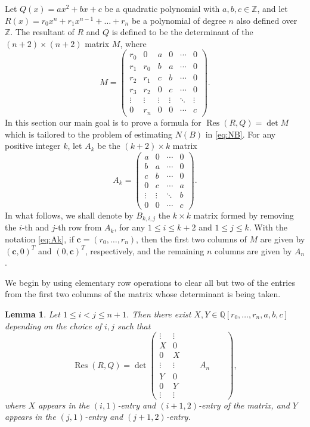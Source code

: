 \documentclass[reqno, 12pt, twoside]{amsart}
\numberwithin{equation}{section}
\DeclareMathOperator{\Res}{Res}
\newcommand{\Q}{\mathbb{Q}}
\newcommand{\Z}{\mathbb{Z}}
\newcommand{\0}{\mathbf{0}}
\newtheorem{lemma}[theorem]{Lemma}
\theoremstyle{definition}
\renewcommand{\leq}{\leqslant}
\begin{document}
Let $Q(x)=ax^2+bx+c$ be a quadratic polynomial with $a,b,c\in \Z$, and let 
$R(x)=r_0x^n+r_1x^{n-1}+\dots+r_n$ be a polynomial of degree $n$ also defined over $\Z$.
The resultant of $R$ and $Q$ is defined to be 
the determinant of the $(n+2)\times (n+2)$ matrix $M$, where
$$
M=
\begin{pmatrix}
r_0 & 0& a& 0& \cdots  & 0 \\
r_1& r_0 &b& a&  \cdots& 0    \\
r_2& r_1&c& b& \cdots  & 0\\
r_3 &r_2&0& c& \cdots  & 0 \\
\vdots&\vdots& \vdots&\vdots & \ddots  & \vdots  \\
0& r_n&  0&  0& \cdots & c
\end{pmatrix}.
$$
In this section our main goal is to prove a formula for 
$\Res(R,Q)=\det M$ which is tailored to the problem of estimating $N(B)$ in \eqref{eq:NB}.
For any positive integer $k$, let $A_k$ be the $(k+2)\times k$ matrix
\begin{equation}\label{eq:Ak}
A_k=
\begin{pmatrix}
 a& 0& \cdots  & 0 \\
b& a&  \cdots& 0     \\
c& b& \cdots  & 0\\
0& c& \cdots  & a \\
 \vdots&\vdots & \ddots  & b  \\
  0&  0&\cdots & c
\end{pmatrix}.\end{equation}
In what follows, we shall denote by $B_{k,i,j}$  the $k\times k$ matrix formed by removing the $i$-th and $j$-th row from $A_{k}$, for any $1\leq i\leq k+2$ and $1\leq j\leq k$.
With the notation \eqref{eq:Ak}, if 
 $\mathbf{c}=(r_0,\dots, r_n)$, then the first two columns of $M$ 
are given by $(\mathbf{c},0)^T$ and $(0,\mathbf{c})^T$, 
 respectively, 
and the remaining $n$ columns are given by  $A_n$. 




We begin by using elementary row operations to clear all but two of  the entries from the first two columns of the matrix whose determinant is being taken. 

\begin{lemma}\label{lem:res1}
Let $1\leq i<j\leq n+1$. Then there exist $X,Y\in\Q[r_0,\dots, r_n,a,b,c]$ depending on the choice of $i,j$ such that 
$$
\Res(R,Q)=
\det
\begin{pmatrix}
\vdots & \vdots & &&&& \\
X     & 0     & &&&&\\
0     & X     & &&&&\\
\vdots & \vdots &&&A_n&& \\
Y     & 0     &  &&&&\\ 
0     & Y     &     &&&&\\
\vdots & \vdots & &&&&
\end{pmatrix},
$$
where $X$ appears in the $(i,1)$-entry and $(i+1,2)$-entry of the matrix,  and $Y$ appears in the $(j,1)$-entry and $(j+1,2)$-entry.
\end{lemma}
\end{document}
